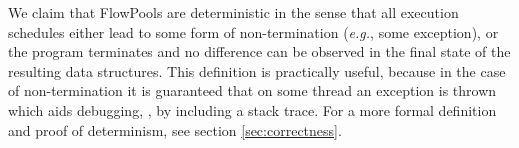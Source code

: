 
We claim that FlowPools are deterministic in the sense that all execution
schedules either lead to some form of non-termination (\textit{e.g.}, some
exception), or the program terminates and no difference can be observed in the
final state of the resulting data structures. This definition is practically
useful, because in the case of non-termination it is guaranteed that on some
thread an exception is thrown which aids debugging, \eg, by including a stack
trace. For a more formal definition and proof of determinism, see section
\ref{sec:correctness}.

%
%


